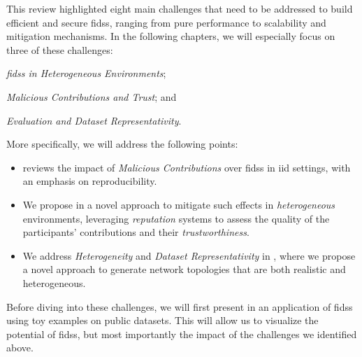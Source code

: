 This review highlighted eight main challenges that need to be addressed to build efficient and secure \glspl{fids}, ranging from pure performance to scalability and mitigation mechanisms.
In the following chapters, we will especially focus on three of these challenges: 
\begin{enumerate*}[(i)]
    \item \emph{\glspl{fids} in Heterogeneous Environments};
    \item \emph{Malicious Contributions and Trust}; and
    \item \emph{Evaluation and Dataset Representativity}.
\end{enumerate*}
More specifically, we will address the following points:
\begin{itemize}
  \item {} reviews the impact of \emph{Malicious Contributions} over \glspl{fids} in \gls{iid} settings, with an emphasis on reproducibility.
  
  \item We propose in  a novel approach to mitigate such effects in \emph{heterogeneous} environments, leveraging \emph{reputation} systems to assess the quality of the participants' contributions and their \emph{trustworthiness}.
  
  \item We address \emph{Heterogeneity} and \emph{Dataset Representativity} in , where we propose a novel approach to generate network topologies that are both realistic and heterogeneous.
\end{itemize}

Before diving into these challenges, we will first present in  an application of \glspl{fids} using toy examples on public datasets.
This will allow us to visualize the potential of \glspl{fids}, but most importantly the impact of the challenges we identified above.